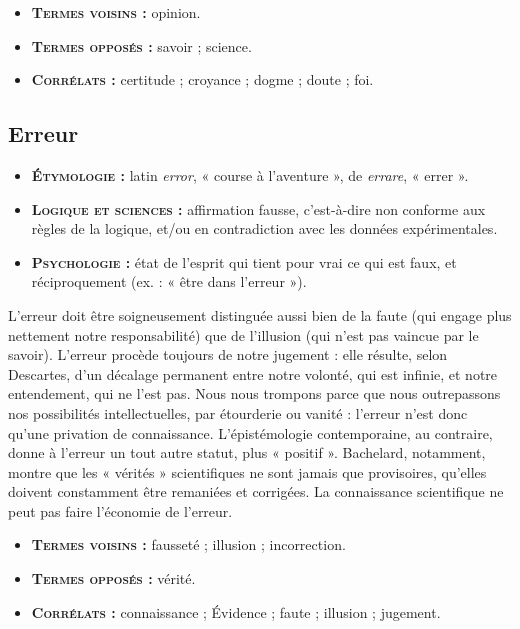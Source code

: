 {\footnotesize
\begin{itemize}[leftmargin=1cm, label=, itemsep=1pt]
\item {\bf \textsc{Termes voisins} :} opinion.
\item {\bf \textsc{Termes opposés} :} savoir ; science.
\item {\bf \textsc{Corrélats} :} certitude ; croyance ;
dogme ; doute ; foi.
\end{itemize}
}


\subsection{Erreur}

{\footnotesize
\begin{itemize}[leftmargin=1cm, label=, itemsep=1pt]
\item {\bf \textsc{Étymologie} :} latin {\it error}, « course
à l'aventure », de {\it errare}, « errer ».
\item {\bf \textsc{Logique et sciences} :} affirmation
fausse, c'est-à-dire non conforme
aux règles de la logique, et/ou en
contradiction avec les données
expérimentales.
\item {\bf \textsc{Psychologie} :} état
de l'esprit qui tient pour vrai ce
qui est faux, et réciproquement
(ex. : « être dans l’erreur »).
\end{itemize}
}

L'erreur doit être soigneusement distinguée
aussi bien de la faute (qui engage
plus nettement notre responsabilité) que
de l’illusion (qui n’est pas vaincue par
le savoir). L'erreur procède toujours de
notre jugement : elle résulte, selon Descartes,
d’un décalage permanent entre
notre volonté, qui est infinie, et notre
entendement, qui ne l'est pas. Nous
nous trompons parce que nous outrepassons
nos possibilités intellectuelles,
par étourderie ou vanité : l'erreur n’est
donc qu'une privation de connaissance.
L'épistémologie contemporaine, au
contraire, donne à l’erreur un tout autre
statut, plus « positif ». Bachelard, notamment,
montre que les « vérités » scientifiques
ne sont jamais que provisoires,
qu'elles doivent constamment être remaniées
et corrigées. La connaissance
scientifique ne peut pas faire l'économie
de l’erreur.

{\footnotesize
\begin{itemize}[leftmargin=1cm, label=, itemsep=1pt]
\item {\bf \textsc{Termes voisins} :} fausseté ; illusion ;
incorrection.
\item {\bf \textsc{Termes opposés} :} vérité.
\item {\bf \textsc{Corrélats} :} connaissance ; Évidence ;
faute ; illusion ; jugement.
\end{itemize}
}

